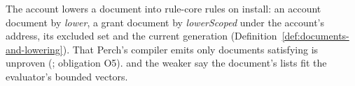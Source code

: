 The account lowers a document into rule-core rules on install: an account
document by \textit{lower}, a grant document by \textit{lowerScoped} under the
account's address, its excluded set and the current generation
(Definition~\ref{def:documents-and-lowering}). That Perch's compiler emits only
documents satisfying  is unproven
(; obligation O5). 
and the weaker  say the document's lists fit the evaluator's
bounded vectors.



